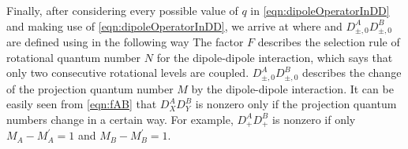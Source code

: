 Finally, after considering every possible  value of $q$ in \autoref{eqn:dipoleOperatorInDD} and making use of \autoref{eqn:dipoleOperatorInDD}, we arrive at 
where
and $D^{A}_{\pm, 0}D^{B}_{\pm, 0}$ are defined using
 in the following way
The factor $F$ describes the selection rule of rotational quantum number $N$ for the dipole-dipole interaction, which 
says that  only two consecutive rotational levels are coupled. $D^{A}_{\pm, 0}D^{B}_{\pm, 0}$ describes the change of
the projection quantum number $M$ by the dipole-dipole interaction. It can be easily seen from \autoref{eqn:fAB}
that $D^{A}_{X}D^{B}_{Y}$ is nonzero only if the projection quantum numbers change in a certain way. For example, 
$D^{A}_{+}D^{B}_{+}$ is nonzero if only $M_A - M_A^{\prime} = 1$ and $M_B - M_B^{\prime} = 1$.  

